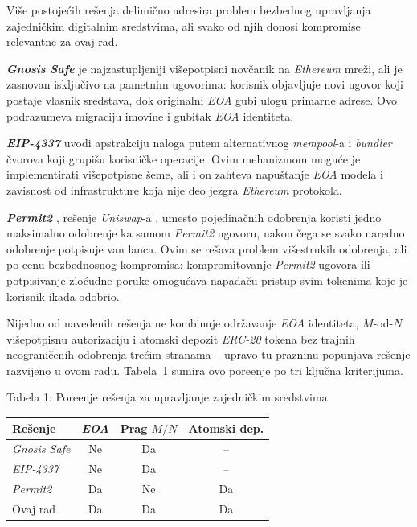 \documentclass[10pt,a4paper]{article}
\newcommand{\en}[1]{\textit{\textenglish{#1}}}
\begin{document}
Vi\v se postoje\'cih re\v senja delimi\v cno adresira problem bezbednog upravljanja zajedni\v ckim digitalnim sredstvima, ali svako od njih donosi kompromise relevantne za ovaj rad.

\textbf{\en{Gnosis Safe}} \cite{safeu,diangelo2020} je najzastupljeniji vi\v sepotpisni nov\v canik na \en{Ethereum} mre\v zi, ali je zasnovan isklju\v civo na pametnim ugovorima: korisnik objavljuje novi ugovor koji postaje vlasnik sredstava, dok originalni \en{EOA} gubi ulogu primarne adrese. Ovo podrazumeva migraciju imovine i gubitak \en{EOA} identiteta.

\textbf{\en{EIP-4337}} \cite{eip4337u} uvodi apstrakciju naloga putem alternativnog \en{mempool}-a i \en{bundler} \v cvorova koji grupi\v su korisni\v cke operacije. Ovim mehanizmom mogu\'ce je implementirati vi\v sepotpisne \v seme, ali i on zahteva napu\v stanje \en{EOA} modela i zavisnost od infrastrukture koja nije deo jezgra \en{Ethereum} protokola.

\textbf{\en{Permit2}} \cite{permit2u}, re\v senje \en{Uniswap}-a \cite{uniswap2021u}, umesto pojedina\v cnih odobrenja koristi jedno maksimalno odobrenje ka samom \en{Permit2} ugovoru, nakon \v cega se svako naredno odobrenje potpisuje van lanca. Ovim se re\v sava problem vi\v sestrukih odobrenja, ali po cenu bezbednosnog kompromisa: kompromitovanje \en{Permit2} ugovora ili potpisivanje zlo\'cudne poruke omogu\'cava napada\v cu pristup svim tokenima koje je korisnik ikada odobrio.

Nijedno od navedenih re\v senja ne kombinuje odr\v zavanje \en{EOA} identiteta, $M$-od-$N$ vi\v sepotpisnu autorizaciju i atomski depozit \en{ERC-20} tokena bez trajnih neograni\v cenih odobrenja tre\'cim stranama -- upravo tu prazninu popunjava re\v senje razvijeno u ovom radu. Tabela~1 sumira ovo pore\dj enje po tri klju\v cna kriterijuma.

\begin{center}
{\footnotesize Tabela 1: Pore\dj enje re\v senja za upravljanje zajedni\v ckim sredstvima}

\vspace{0.2cm}
\small
\begin{tabular}{lccc}
\hline
\textbf{Re\v senje} & \textbf{\en{EOA}} & \textbf{Prag $M/N$} & \textbf{Atomski dep.} \\
\hline
\en{Gnosis Safe} & Ne & Da & -- \\
\en{EIP-4337} & Ne & Da & -- \\
\en{Permit2} & Da & Ne & Da \\
Ovaj rad & Da & Da & Da \\
\hline
\end{tabular}
\end{center}
\end{document}
